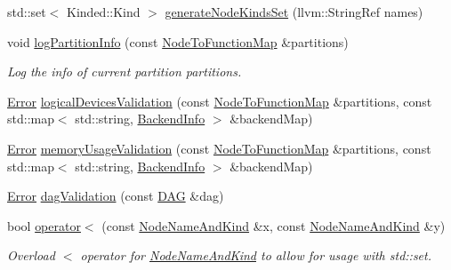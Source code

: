 \begin{DoxyCompactItemize}
std\+::set$<$ Kinded\+::\+Kind $>$ \hyperlink{namespaceglow_a9d06550bdaa17730cb67e8a086db767c}{generate\+Node\+Kinds\+Set} (llvm\+::\+String\+Ref names)
\item 
\mbox{\label{namespaceglow_a52aab7cde0b8f39f6420e1c47c57ff34}} 
void \hyperlink{namespaceglow_a52aab7cde0b8f39f6420e1c47c57ff34}{log\+Partition\+Info} (const \hyperlink{classglow_1_1_node_to_function_map}{Node\+To\+Function\+Map} \&partitions)
\begin{DoxyCompactList}\small\item\em Log the info of current partition {\ttfamily partitions}. \end{DoxyCompactList}\item 
\hyperlink{namespaceglow_afdb176c3a672ef66db0ecfc19a8d39bf}{Error} \hyperlink{namespaceglow_a85a9500a329d096bf03201016353f1dd}{logical\+Devices\+Validation} (const \hyperlink{classglow_1_1_node_to_function_map}{Node\+To\+Function\+Map} \&partitions, const std\+::map$<$ std\+::string, \hyperlink{structglow_1_1_backend_info}{Backend\+Info} $>$ \&backend\+Map)
\item 
\hyperlink{namespaceglow_afdb176c3a672ef66db0ecfc19a8d39bf}{Error} \hyperlink{namespaceglow_a07a0a4dcd72e491d512294eec2ba422a}{memory\+Usage\+Validation} (const \hyperlink{classglow_1_1_node_to_function_map}{Node\+To\+Function\+Map} \&partitions, const std\+::map$<$ std\+::string, \hyperlink{structglow_1_1_backend_info}{Backend\+Info} $>$ \&backend\+Map)
\item 
\hyperlink{namespaceglow_afdb176c3a672ef66db0ecfc19a8d39bf}{Error} \hyperlink{namespaceglow_ad40999bf88c854e1ca4bcbfa9efbd119}{dag\+Validation} (const \hyperlink{structglow_1_1runtime_1_1_d_a_g}{D\+AG} \&dag)
\item 
\mbox{\label{namespaceglow_a159a23dd0c029682e58c8634f5866539}} 
bool \hyperlink{namespaceglow_a159a23dd0c029682e58c8634f5866539}{operator$<$} (const \hyperlink{structglow_1_1_node_name_and_kind}{Node\+Name\+And\+Kind} \&x, const \hyperlink{structglow_1_1_node_name_and_kind}{Node\+Name\+And\+Kind} \&y)
\begin{DoxyCompactList}\small\item\em Overload $<$ operator for \hyperlink{structglow_1_1_node_name_and_kind}{Node\+Name\+And\+Kind} to allow for usage with std\+::set. \end{DoxyCompactList}\item 
\mbox{\label{namespaceglow_a3bb55fda5495f592ea57c2a223c4e0a7}} 

\end{DoxyCompactItemize}

